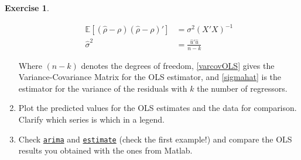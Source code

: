 \documentclass[a4paper,11pt]{article}
\theoremstyle{definition}
\newtheorem{exercise}{Exercise}
\begin{document}
\begin{exercise}
\begin{enumerate}
		\begin{align}
		\mathbb{E}\left[(\hat{\rho}-\rho)(\hat{\rho}-\rho)'\right] &= \sigma^2\left(X'X\right)^{-1} \label{varcovOLS}\\
		\hat{\sigma}^2 &= \frac{\hat{u}' \hat{u}}{n-k} \label{sigmahat}
		\end{align}
		
	Where $(n-k)$ denotes the degrees of freedom, \eqref{varcovOLS} gives the Variance-Covariance Matrix for the OLS estimator, and \eqref{sigmahat} is the estimator for the variance of the residuals with $k$ the number of regressors.

	\item Plot the predicted values for the OLS estimates and the data for comparison. Clarify which series is which in a legend.
	\item Check \href{https://www.mathworks.com/help/econ/specify-ar-models.html}{\texttt{arima}} and \href{https://www.mathworks.com/help/econ/arima.estimate.html?s_tid=doc_ta}{\texttt{estimate}} {\tiny (check the first example!)} and compare the OLS results you obtained with the ones from Matlab.
\end{enumerate}
\end{exercise}
\end{document}
